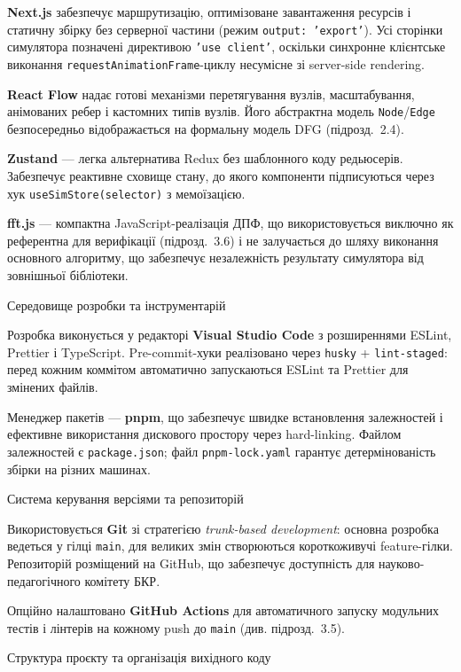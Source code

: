 \textbf{Next.js} забезпечує маршрутизацію, оптимізоване завантаження
ресурсів і статичну збірку без серверної частини (режим
\texttt{output:\ ’export’}). Усі сторінки симулятора позначені
директивою \texttt{’use\ client’}, оскільки синхронне клієнтське
виконання \texttt{requestAnimationFrame}-циклу несумісне зі server-side
rendering.

\textbf{React Flow} надає готові механізми перетягування вузлів,
масштабування, анімованих ребер і кастомних типів вузлів. Його
абстрактна модель \texttt{Node}/\texttt{Edge} безпосередньо
відображається на формальну модель DFG (підрозд.~2.4).

\textbf{Zustand} --- легка альтернатива Redux без шаблонного коду
редьюсерів. Забезпечує реактивне сховище стану, до якого компоненти
підписуються через хук \texttt{useSimStore(selector)} з мемоїзацією.

\textbf{fft.js} --- компактна JavaScript-реалізація ДПФ, що
використовується виключно як референтна для верифікації (підрозд.~3.6) і
не залучається до шляху виконання основного алгоритму, що забезпечує
незалежність результату симулятора від зовнішньої бібліотеки.

Середовище розробки та інструментарій

Розробка виконується у редакторі \textbf{Visual Studio Code} з
розширеннями ESLint, Prettier і TypeScript. Pre-commit-хуки реалізовано
через \texttt{husky} + \texttt{lint-staged}: перед кожним коммітом
автоматично запускаються ESLint та Prettier для змінених файлів.

Менеджер пакетів --- \textbf{pnpm}, що забезпечує швидке встановлення
залежностей і ефективне використання дискового простору через
hard-linking. Файлом залежностей є \texttt{package.json}; файл
\texttt{pnpm-lock.yaml} гарантує детермінованість збірки на різних
машинах.

Система керування версіями та репозиторій

Використовується \textbf{Git} зі стратегією \emph{trunk-based
development}: основна розробка ведеться у гілці \texttt{main}, для
великих змін створюються короткоживучі feature-гілки. Репозиторій
розміщений на GitHub, що забезпечує доступність для
науково-педагогічного комітету БКР.

Опційно налаштовано \textbf{GitHub Actions} для автоматичного запуску
модульних тестів і лінтерів на кожному push до \texttt{main} (див.
підрозд.~3.5).

\protect{}\label{_Toc229681128}{}Структура проєкту та
організація вихідного коду

